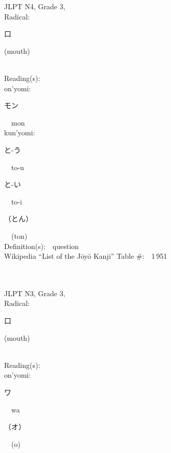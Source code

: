 \begin{multicols}{2}
{JLPT N4, Grade 3, \\Radical:\ \ {\begin{CJK}{UTF8}{min} 口 \end{CJK}} (mouth) } \\
Reading(s):\ \ \\
{\hspace*{1em}}on'yomi:\ \ \\
{\hspace*{2em}}{\begin{CJK}{UTF8}{min} モン \end{CJK}}\ \ mon\ \ \\
{\hspace*{1em}}kun'yomi:\ \ \\
{\hspace*{2em}}{\begin{CJK}{UTF8}{min} と-う \end{CJK}}\ \ to-u\ \ \\
{\hspace*{2em}}{\begin{CJK}{UTF8}{min} と-い \end{CJK}}\ \ to-i\ \ \\
{\hspace*{2em}}{\begin{CJK}{UTF8}{min} （とん） \end{CJK}}\ \ (ton)\ \ \\
Definition(s):\ \ question \\
Wikipedia ``List of the J\=oy\=o Kanji'' Table \#:\ \ 1\,951 \\
\ \ \\
{\fontsize{34pt}{40pt}  }\ \ \\  %
{JLPT N3, Grade 3, \\Radical:\ \ {\begin{CJK}{UTF8}{min} 口 \end{CJK}} (mouth) } \\
Reading(s):\ \ \\
{\hspace*{1em}}on'yomi:\ \ \\
{\hspace*{2em}}{\begin{CJK}{UTF8}{min} ワ \end{CJK}}\ \ wa\ \ \\
{\hspace*{2em}}{\begin{CJK}{UTF8}{min} （オ） \end{CJK}}\ \ (o)\ \ \\

\end{multicols}

